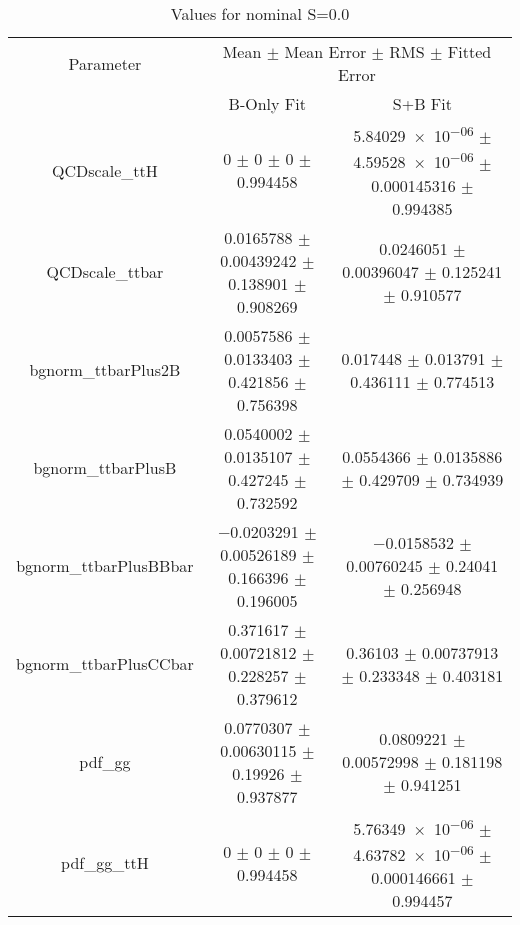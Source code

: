 \begin{table}
\centering
\caption{Values for nominal S=0.0}
\begin{tabular}{ccc}
\toprule
Parameter & \multicolumn{2}{c}{Mean $\pm$ Mean Error $\pm$ RMS $\pm$ Fitted Error}\\
 & B-Only Fit & S+B Fit\\
\midrule
QCDscale\_ttH & \num{0} $\pm$ \num{0} $\pm$ \num{0} $\pm$ \num{0.994458} & \num{5.84029e-06} $\pm$ \num{4.59528e-06} $\pm$ \num{0.000145316} $\pm$ \num{0.994385}\\
QCDscale\_ttbar & \num{0.0165788} $\pm$ \num{0.00439242} $\pm$ \num{0.138901} $\pm$ \num{0.908269} & \num{0.0246051} $\pm$ \num{0.00396047} $\pm$ \num{0.125241} $\pm$ \num{0.910577}\\
bgnorm\_ttbarPlus2B & \num{0.0057586} $\pm$ \num{0.0133403} $\pm$ \num{0.421856} $\pm$ \num{0.756398} & \num{0.017448} $\pm$ \num{0.013791} $\pm$ \num{0.436111} $\pm$ \num{0.774513}\\
bgnorm\_ttbarPlusB & \num{0.0540002} $\pm$ \num{0.0135107} $\pm$ \num{0.427245} $\pm$ \num{0.732592} & \num{0.0554366} $\pm$ \num{0.0135886} $\pm$ \num{0.429709} $\pm$ \num{0.734939}\\
bgnorm\_ttbarPlusBBbar & \num{-0.0203291} $\pm$ \num{0.00526189} $\pm$ \num{0.166396} $\pm$ \num{0.196005} & \num{-0.0158532} $\pm$ \num{0.00760245} $\pm$ \num{0.24041} $\pm$ \num{0.256948}\\
bgnorm\_ttbarPlusCCbar & \num{0.371617} $\pm$ \num{0.00721812} $\pm$ \num{0.228257} $\pm$ \num{0.379612} & \num{0.36103} $\pm$ \num{0.00737913} $\pm$ \num{0.233348} $\pm$ \num{0.403181}\\
pdf\_gg & \num{0.0770307} $\pm$ \num{0.00630115} $\pm$ \num{0.19926} $\pm$ \num{0.937877} & \num{0.0809221} $\pm$ \num{0.00572998} $\pm$ \num{0.181198} $\pm$ \num{0.941251}\\
pdf\_gg\_ttH & \num{0} $\pm$ \num{0} $\pm$ \num{0} $\pm$ \num{0.994458} & \num{5.76349e-06} $\pm$ \num{4.63782e-06} $\pm$ \num{0.000146661} $\pm$ \num{0.994457}\\
\bottomrule
\end{tabular}
\end{table}